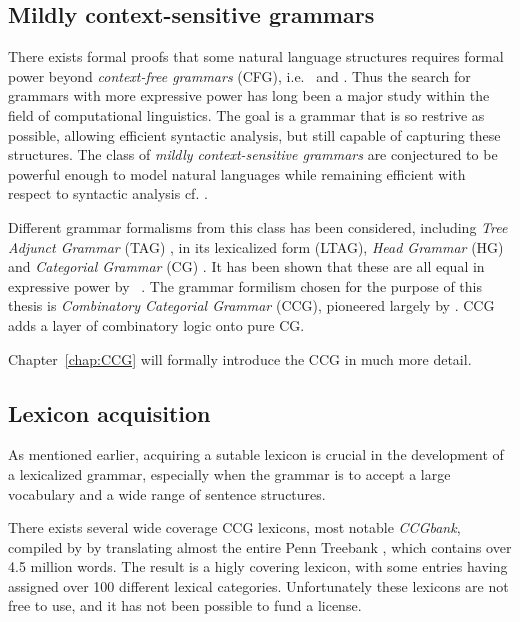 \subsection{Mildly context-sensitive grammars}
There exists formal proofs that some natural language structures requires formal power beyond \emph{context-free grammars} (CFG), i.e.\ \cite{nlpNotCFG} and \cite{nlpNotCFG2}. Thus the search for grammars with more expressive power has long been a major study within the field of computational linguistics. The goal is a grammar that is so restrive as possible, allowing efficient syntactic analysis, but still capable of capturing these structures. The class of \emph{mildly context-sensitive grammars} are conjectured to be powerful enough to model natural languages while remaining efficient with respect to syntactic analysis cf. \cite{mildlyCSG}.

Different grammar formalisms from this class has been considered, including \emph{Tree Adjunct Grammar} (TAG) \cite{tag}, in its lexicalized form (LTAG), \emph{Head Grammar} (HG) \cite{hg} and \emph{Categorial Grammar} (CG) \cite{steedmanDraft}.
It has been shown that these are all equal in expressive power by \citeauthor{theEquivalence}~. The grammar formilism chosen for the purpose of this thesis is \emph{Combinatory Categorial Grammar} (CCG), pioneered largely by \citeauthor{sp} . CCG adds a layer of combinatory logic onto pure CG.


Chapter~\ref{chap:CCG} will formally introduce the CCG in much more detail.


\subsection{Lexicon acquisition}
As mentioned earlier, acquiring a sutable lexicon is crucial in the development of a lexicalized grammar, especially when the grammar is to accept a large vocabulary and a wide range of sentence structures.
\clearpage

There exists several wide coverage CCG lexicons, most notable \emph{CCGbank}, compiled by \citeauthor{ccgBank}  by translating almost the entire Penn Treebank \cite{pennTreebank}, which contains over 4.5 million words. The result is a higly covering lexicon, with some entries having assigned over 100 different lexical categories. Unfortunately these lexicons are not free to use, and it has not been possible to fund a license.

